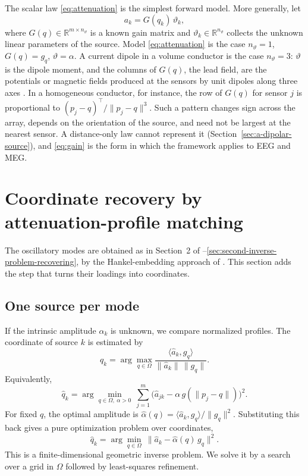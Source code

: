 \documentclass{article}
\begin{document}
The scalar law \eqref{eq:attenuation} is the simplest forward model. More generally, let 
\begin{equation} \label{eq:gain}
a_k = G(q_k)\, \vartheta_k,
\end{equation} where $G(q) \in \mathbb{R}^{m \times n_\vartheta}$ is a known gain matrix and $\vartheta_k \in \mathbb{R}^{n_\vartheta}$ collects the unknown linear parameters of the source. Model \eqref{eq:attenuation} is the case $n_\vartheta = 1$, $G(q) = g_q$, $\vartheta = \alpha$. A current dipole in a volume conductor is the case $n_\vartheta = 3$: $\vartheta$ is the dipole moment, and the columns of $G(q)$, the lead field, are the potentials or magnetic fields produced at the sensors by unit dipoles along three axes \cite{ref-Mosher02, ref-Baillet}. In a homogeneous conductor, for instance, the row of $G(q)$ for sensor $j$ is proportional to $(p_j - q)^{\top} / \lVert p_j - q \rVert^{3}$. Such a pattern changes sign across the array, depends on the orientation of the source, and need not be largest at the nearest sensor. A distance-only law cannot represent it (Section~\ref{sec:a-dipolar-source}), and \eqref{eq:gain} is the form in which the framework applies to EEG and MEG.

\section{Coordinate recovery by attenuation-profile matching}\label{sec:coordinate-recovery-by-attenuation}

The oscillatory modes are obtained as in Section~2 of \cite{ref-companionA}--\ref{sec:second-inverse-problem-recovering}, by the Hankel-embedding approach of \cite{ref-BernadotteBuchstaber, ref-Bernadotte05, ref-Bernadotte06}. This section adds the step that turns their loadings into coordinates.

\subsection{One source per mode}\label{sec:one-source-per-mode}

If the intrinsic amplitude $\alpha_k$ is unknown, we compare normalized profiles. The coordinate of source $k$ is estimated by 
\begin{equation} \label{eq:matching}
\widehat{q}_k = \arg\max_{q \in \Omega} \frac{\langle \widehat{a}_k, g_q \rangle}{\lVert \widehat{a}_k \rVert\, \lVert g_q \rVert}.
\end{equation} Equivalently, \[
\widehat{q}_k = \arg\min_{q \in \Omega,\ \alpha > 0}\ \sum_{j=1}^{m} \bigl(\widehat{a}_{jk} - \alpha\, g(\lVert p_j - q \rVert)\bigr)^{2}.
\] For fixed $q$, the optimal amplitude is $\widehat{\alpha}(q) = \langle \widehat{a}_k, g_q \rangle / \lVert g_q \rVert^{2}$. Substituting this back gives a pure optimization problem over coordinates, \[
\widehat{q}_k = \arg\min_{q \in \Omega}\ \lVert \widehat{a}_k - \widehat{\alpha}(q)\, g_q \rVert^{2}.
\] This is a finite-dimensional geometric inverse problem. We solve it by a search over a grid in $\Omega$ followed by least-squares refinement.
\end{document}
